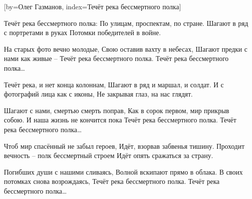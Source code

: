 [by={Олег Газманов},
                     index={Течёт река бессмертного полка}]
\beginverse

Течёт река бессмертного полка:
По улицам, проспектам, по стране.
Шагают в ряд с портретами в руках
Потомки победителей в войне.

\endverse
\beginverse

На старых фото вечно молодые,
Свою оставив вахту в небесах,
Шагают предки с нами как живые –
Течёт река бессмертного полка.
Течёт река бессмертного полка…

\endverse
\beginverse

Течёт река, и нет конца колоннам,
Шагают в ряд и маршал, и солдат.
И с фотографий лица как с иконы,
Не закрывая глаз, на нас глядят.

\endverse
\beginverse

Шагают с нами, смертью смерть поправ,
Как в сорок первом, мир прикрыв собою.
И наша жизнь не кончится пока
Течёт река бессмертного полка.
Течёт река бессмертного полка…

\endverse
\beginverse

Чтоб мир спасённый не забыл героев,
Идёт, взорвав забвенья тишину.
Проходит вечность – полк бессмертный строем
Идёт опять сражаться за страну.

\endverse
\beginverse

Погибших души с нашими сливаясь,
Волной вскипают прямо в облака.
В своих потомках снова возрождаясь,
Течёт река бессмертного полка.
Течёт река бессмертного полка…

\endverse
\endsong